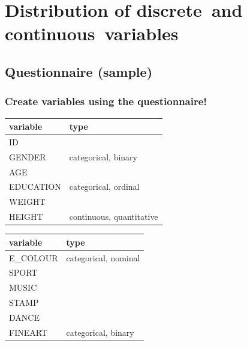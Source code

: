 \chapter[Distribution of discrete and continuous variables]{Distribution of discrete~and\\ continuous~variables}
\section{Questionnaire (sample)}

\subsection{Create variables using the questionnaire!}

\begin{minipage}{0.48\textwidth}
\centering
	\begin{tabular}{ll}
	\toprule
	variable & type\\
	\midrule
		 ID\\
		 GENDER & categorical, binary\\
		 AGE & \\
		 EDUCATION &categorical, ordinal\\
		 WEIGHT\\
		HEIGHT & continuous, quantitative\\
		  \bottomrule
	\end{tabular}
\end{minipage}
\begin{minipage}{0.48\textwidth}
\centering
	\begin{tabular}{ll}
	\toprule
	variable & type\\
	\midrule
		  E\_COLOUR & categorical, nominal\\
		  SPORT\\
		  MUSIC\\
		  STAMP\\
  		  DANCE&\\
		  FINEART & categorical, binary\\
		  \bottomrule
	\end{tabular}
\end{minipage}



